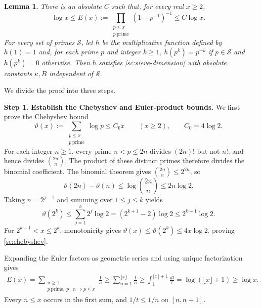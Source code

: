 \documentclass[twoside]{aomart}
\makeatletter
\theoremstyle{paperplain}
\newtheorem{lemma}[theorem]{Lemma}
\theoremstyle{paperdefinition}
\renewenvironment{proof}[1][\proofname]{\par\pushQED{\qed}%
  \normalfont\topsep6\p@\@plus3\p@\relax\trivlist
  \item[\hskip\labelsep\itshape #1\@addpunct{.}]\ignorespaces
}{\popQED\endtrivlist\@endpefalse}
\numberwithin{equation}{section}
\makeatother
\begin{document}
\begin{lemma}\label{sc:prime-products}
There is an absolute $C$ such that, for every real $x\ge2$,
\begin{equation}
 \log x\le E(x):=\prod_{\substack{p\le x\\p\ \mathrm{prime}}}(1-p^{-1})^{-1}\le C\log x.
 \label{sc:bsz-euler-bounds}
\end{equation}
For every set of primes $\mathcal S$, let $h$ be the multiplicative
function defined by $h(1)=1$ and, for each prime $p$ and integer $k\ge1$,
$h(p^k)=p^{-k}$ if $p\in\mathcal S$ and $h(p^k)=0$ otherwise.
Then $h$ satisfies \eqref{sc:sieve-dimension} with absolute constants
$\kappa,B$ independent of $\mathcal S$.
\end{lemma}

\begin{proof}
We divide the proof into three steps.
\par
\medskip
\noindent\textbf{Step 1. Establish the Chebyshev and Euler-product bounds.}
We first prove the Chebyshev bound
\begin{equation}
 \vartheta(x):=\sum_{\substack{p\le x\\p\ \mathrm{prime}}}\log p\le C_0x
 \qquad(x\ge2),\qquad C_0=4\log2.
 \label{sc:chebyshev}
\end{equation}
For each integer $n\ge1$, every prime $n<p\le2n$ divides $(2n)!$
but not $n!$, and hence divides $\displaystyle\binom{2n}{n}$. The product of
these distinct primes therefore divides the binomial coefficient.
The binomial theorem gives $\displaystyle\binom{2n}{n}\le2^{2n}$, so
\begin{equation*}
 \vartheta(2n)-\vartheta(n)
 \le\log\binom{2n}{n}\le2n\log2.
\end{equation*}
Taking $n=2^{j-1}$ and summing over $1\le j\le k$ yields
\begin{equation*}
 \vartheta(2^k)
 \le\sum_{j=1}^k2^j\log2
 =(2^{k+1}-2)\log2\le2^{k+1}\log2.
\end{equation*}
For $2^{k-1}<x\le2^k$, monotonicity gives
$\vartheta(x)\le\vartheta(2^k)\le4x\log2$, proving
\eqref{sc:chebyshev}.

Expanding the Euler factors as geometric series and using unique
factorization gives
\begin{equation*}
 \begin{aligned}
 E(x)
 =\sum_{\substack{n\ge1\\p\ \mathrm{prime},\ p\mid n\Rightarrow p\le x}}\frac1n
 \ge\sum_{n=1}^{\lfloor x\rfloor}\frac1n
 \ge\int_1^{\lfloor x\rfloor+1}\frac{dt}{t}
 =\log(\lfloor x\rfloor+1)\ge\log x.
 \end{aligned}
\end{equation*}
Every $n\le x$ occurs in the first sum, and $1/t\le1/n$ on
$[n,n+1]$.


\end{proof}
\end{document}

